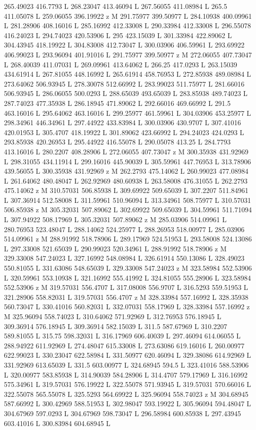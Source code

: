 {\begin{scope}[local bounding box=bb]
{265.49023 416.7793 L 268.23047 413.46094 L 267.56055 411.08984 L 265.5 411.05078 L 259.06055 396.19922 z M 291.75977 399.50977 L 284.10938 400.09961 L 281.28906 408.16016 L 285.16992 412.33008 L 290.33984 412.33008 L 296.55078 416.24023 L 294.74023 420.53906 L 295 423.15039 L 301.33984 422.89062 L 304.43945 418.19922 L 304.83008 412.73047 L 300.03906 406.59961 L 293.69922 406.99023 L 293.96094 401.91016 L 291.75977 399.50977 z M 272.06055 407.73047 L 268.40039 411.07031 L 269.09961 413.64062 L 266.25 417.0293 L 263.15039 434.61914 L 267.81055 448.16992 L 265.61914 458.76953 L 272.85938 489.08984 L 273.64062 506.93945 L 278.30078 512.66992 L 283.99023 511.75977 L 281.66016 506.93945 L 286.06055 500.0293 L 288.65039 493.65039 L 283.85938 489.74023 L 287.74023 477.35938 L 286.18945 471.89062 L 292.66016 469.66992 L 291.5 463.16016 L 295.64062 463.16016 L 299.25977 461.59961 L 304.03906 453.25977 L 298.34961 446.34961 L 297.44922 433.83984 L 300.03906 430.9707 L 307.41016 420.01953 L 305.4707 418.19922 L 301.89062 423.66992 L 294.24023 424.0293 L 293.85938 420.26953 L 295.44922 416.55078 L 290.05078 413.25 L 284.7793 413.16016 L 280.2207 408.28906 L 272.06055 407.73047 z M 300.35938 431.92969 L 298.31055 434.11914 L 299.16016 445.90039 L 305.59961 447.76953 L 313.78906 439.56055 L 300.35938 431.92969 z M 262.2793 475.14062 L 260.99023 477.08984 L 261.64062 480.48047 L 262.92969 480.60938 L 263.58008 476.31055 L 262.2793 475.14062 z M 310.57031 506.85938 L 309.69922 509.65039 L 307.2207 511.84961 L 307.36914 512.58008 L 311.59961 510.96094 L 313.34961 508.75977 L 310.57031 506.85938 z M 305.32031 507.89062 L 302.69922 509.65039 L 304.59961 511.71094 L 307.94922 508.17969 L 305.32031 507.89062 z M 285.03906 514.09961 L 280.76953 523.48047 L 288.14062 524.25977 L 288.26953 518.00977 L 285.03906 514.09961 z M 288.91992 518.78906 L 289.17969 524.51953 L 293.58008 524.13086 L 297.33008 521.65039 L 290.99023 520.34961 L 288.91992 518.78906 z M 329.33008 547.24023 L 327.16992 548.08984 L 326.61914 550.13086 L 328.49023 550.81055 L 331.63086 548.65039 L 329.33008 547.24023 z M 323.58984 552.53906 L 320.59961 553.10938 L 321.16992 555.41992 L 324.81055 555.28906 L 323.58984 552.53906 z M 319.57031 556.4707 L 317.08008 556.9707 L 316.5293 559.51953 L 321.28906 558.82031 L 319.57031 556.4707 z M 328.33984 557.16992 L 328.35938 560.73047 L 330.41016 560.82031 L 332.07031 558.17969 L 328.33984 557.16992 z M 325.96094 558.74023 L 310.64062 571.92969 L 312.76953 576.18945 L 309.36914 576.18945 L 309.36914 582.15039 L 311.5 587.67969 L 310.2207 589.81055 L 315.75 598.32031 L 316.17969 606.40039 L 297.46094 614.06055 L 288.94922 611.92969 L 274.48047 615.33008 L 273.63086 619.16016 L 260.00977 622.99023 L 330.23047 622.58984 L 331.50977 620.46094 L 329.38086 614.92969 L 331.92969 613.65039 L 331.5 603.00977 L 324.68945 594.5 L 323.41016 588.53906 L 320.00977 583.85938 L 314.90039 584.28906 L 314.4707 579.17969 L 316.16992 575.34961 L 319.57031 576.19922 L 322.55078 571.93945 L 319.57031 570.66016 L 322.55078 565.55078 L 325.5293 564.69922 L 325.96094 558.74023 z M 304.68945 587.66992 L 300.42969 588.51953 L 302.98047 593.19922 L 305.96094 594.48047 L 304.67969 597.0293 L 304.67969 598.73047 L 296.58984 600.85938 L 297.43945 603.41016 L 300.83984 604.68945 L }
\end{scope}}
